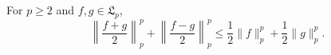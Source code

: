 For $p \geq 2$ and $f, g \in \mathfrak{L}_p$,
$$\left\| \frac{f + g}{2} \right\|_p^p + \left\| \frac{f - g}{2} \right\|_p^p \leq \frac{1}{2} \|f\|_p^p + \frac{1}{2} \|g\|_p^p.$$
